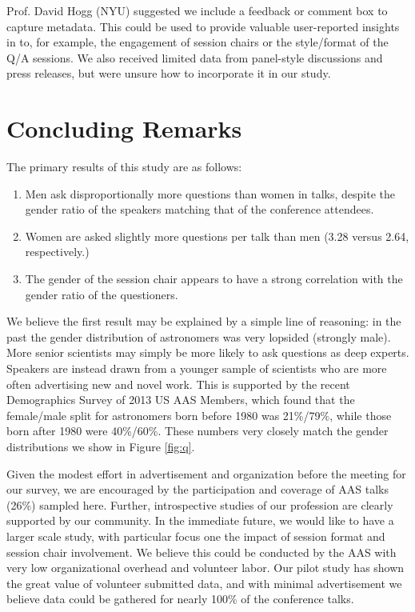 \documentclass[iop]{emulateapj}
\begin{document}
Prof. David Hogg (NYU) suggested we include a feedback or comment box to capture metadata. This could be used to provide valuable user-reported insights in to, for example, the engagement of session chairs or the style/format of the Q/A sessions. 
We also received limited data from panel-style discussions and press releases, but were unsure how to incorporate it in our study. 






\section{Concluding Remarks}

The primary results of this study are as follows:
\begin{enumerate}

\item Men ask disproportionally more questions than women in talks, despite the gender ratio of the speakers matching that of the conference attendees.\vspace{0.04in}

\item Women are asked slightly more questions per talk than men (3.28 versus 2.64, respectively.)

\item The gender of the session chair appears to have a strong correlation with the gender ratio of the questioners.

\end{enumerate}


We believe the first result may be explained by a simple line of reasoning: in the past the gender distribution of astronomers was very lopsided (strongly male). More senior scientists may simply be more likely to ask questions as deep experts. Speakers are instead drawn from a younger sample of scientists who are more often advertising new and novel work. This is supported by the recent Demographics Survey of 2013 US AAS Members, which found that the female/male split for astronomers born before 1980 was 21\%/79\%, while those born after 1980 were 40\%/60\%. These numbers very closely match the gender distributions we show in Figure \ref{fig:q}.

Given the modest effort in advertisement and organization before the meeting for our survey, we are encouraged by the participation and coverage of AAS talks (26\%) sampled here. Further, introspective studies of our profession are clearly supported by our community. In the immediate future, we would like to have a larger scale study, with particular focus one the impact of session format and session chair involvement. We believe this could be conducted by the AAS with very low organizational overhead and volunteer labor. Our pilot study has shown the great value of volunteer submitted data, and with minimal advertisement we believe data could be gathered for nearly 100\% of the conference talks.
\end{document}
